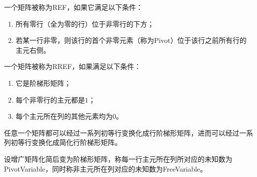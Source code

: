 \begin{definition}
	一个矩阵被称为\gls{REF}，如果它满足以下条件：
	\begin{enumerate}
		\item 所有零行（全为零的行）位于非零行的下方；
		\item 若某一行非零，则该行的首个非零元素（称为\gls{Pivot}）位于该行之前所有行的主元右侧。
	\end{enumerate}
	一个矩阵被称为\gls{RREF}，如果满足以下条件：
	\begin{enumerate}
		\item 它是阶梯形矩阵；
		\item 每个非零行的主元都是$1$；
		\item 每个主元所在列的其他元素均为$0$。
	\end{enumerate}
\end{definition}
\begin{theorem}
	任意一个矩阵都可以经过一系列初等行变换化成行阶梯形矩阵，进而可以经过一系列初等行变换化成简化行阶梯形矩阵。
\end{theorem}
\begin{definition}
	设增广矩阵化简后变为阶梯形矩阵，称每一行主元所在列所对应的未知数为\gls{PivotVariable}，同时称非主元所在列对应的未知数为\gls{FreeVariable}。
\end{definition}
